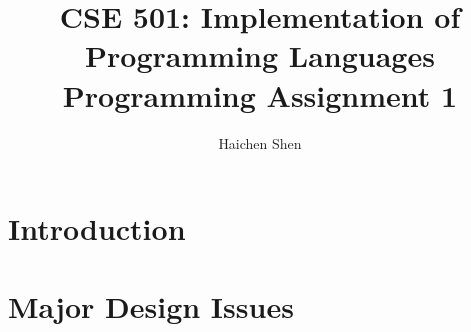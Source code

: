 \documentclass{llncs}
\title{CSE 501: Implementation of Programming Languages\\ Programming Assignment 1}
\author{Haichen Shen}
\institute{}
\begin{document}
\maketitle

\section{Introduction}
\section{Major Design Issues}

%
%
\end{document}
